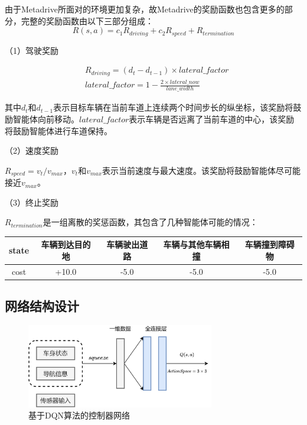 由于Metadrive所面对的环境更加复杂，故Metadrive的奖励函数也包含更多的部分，完整的奖励函数由以下三部分组成：
\begin{equation}
    R(s,a) = c_1 R_{driving} + c_2 R_{speed} + R_{termination}
\end{equation}

（1）驾驶奖励

\begin{equation*}
    \begin{aligned}
        &R_{driving} = (d_t - d_{t-1}) \times lateral\_factor\\
        &lateral\_factor = 1 - \frac{2\times lateral\_now }{lane\_width}
    \end{aligned}
\end{equation*}

其中$d_t$和$d_{t-1}$表示目标车辆在当前车道上连续两个时间步长的纵坐标，该奖励将鼓励智能体向前移动。$lateral\_factor$表示车辆是否远离了当前车道的中心，该奖励将鼓励智能体进行车道保持。

（2）速度奖励

$R_{speed} = v_t / v_{max}$，$v_t$和$v_{max}$表示当前速度与最大速度。该奖励将鼓励智能体尽可能接近$v_{max}$。

（3）终止奖励

$R_{termination}$是一组离散的奖惩函数，其包含了几种智能体可能的情况：
\begin{table}[htbp]
    \centering
    \renewcommand\arraystretch{1.5}
    \begin{tabular}{|c|c|c|c|c|}
    \hline
    state & 车辆到达目的地 & 车辆驶出道路 & 车辆与其他车辆相撞 & 车辆撞到障碍物 \\ \hline
    cost  & +10.0   & -5.0   & -5.0      & -5.0    \\ \hline
    \end{tabular}
\end{table}

\subsection{网络结构设计} %

\begin{figure}[htbp]
    \vspace{13pt}
    \centering
    \includegraphics[width=0.73\textwidth]{images/chapter3/metadrive_control.png}
    \caption{基于DQN算法的控制器网络}\label{DQN算法的控制器网络} %
\end{figure}  

